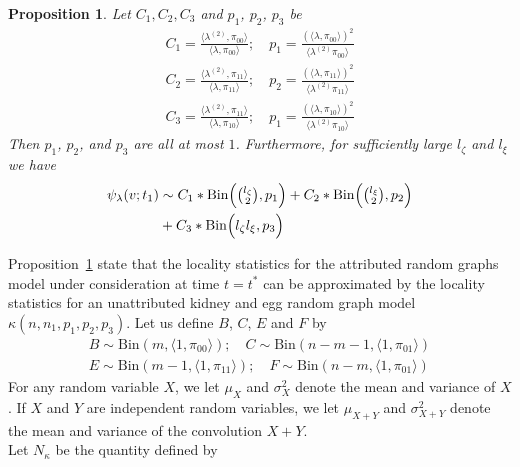 \documentclass[draftcls]{IEEEtran}
\newtheorem{proposition}[theorem]{Proposition}
\theoremstyle{definition}
\begin{document}
\begin{proposition}
  \label{prop:2}
  Let $C_1, C_2, C_3$ and $p_1$, $p_2$, $p_3$ be 
  \begin{gather*}
C_1 = \tfrac{\langle \lambda^{(2)}, \pi_{00} \rangle}{\langle \lambda,
    \pi_{00}\rangle}; \quad p_1 = \tfrac{(\langle \lambda, \pi_{00}
    \rangle)^{2}}{\langle \lambda^{(2)} \pi_{00} \rangle} \\
C_2 = \tfrac{\langle \lambda^{(2)}, \pi_{11} \rangle}{\langle \lambda,
    \pi_{11}\rangle}; \quad p_2 = \tfrac{(\langle \lambda, \pi_{11}
    \rangle)^{2}}{\langle \lambda^{(2)} \pi_{11} \rangle} \\
C_3 = \tfrac{\langle \lambda^{(2)}, \pi_{11} \rangle}{\langle \lambda,
    \pi_{10}\rangle}; \quad p_1 = \tfrac{(\langle \lambda, \pi_{10}
    \rangle)^{2}}{\langle \lambda^{(2)} \pi_{10} \rangle} 
\end{gather*}
  Then $p_1$, $p_2$, and $p_3$ are all at most $1$. Furthermore, for
  sufficiently large $l_\zeta$ and $l_\xi$ we have
\begin{equation*}
  \begin{split}
 \psi_{\lambda}(v;t_1) &\sim C_1 *  
 \mathrm{Bin}\Bigl(\tbinom{l_\zeta}{2}, p_1\Bigr) + C_2 *  
 \mathrm{Bin}\Bigl(\tbinom{l_\xi}{2}, p_2\Bigr) \\ &+ C_3 *
 \mathrm{Bin}\Bigl(l_\zeta l_\xi, p_3\Bigr)
 \end{split}
\end{equation*} 
\end{proposition}
Proposition~\ref{prop:2} state that the locality statistics
for the attributed random graphs model under consideration at time $t
= t^{*}$ can be approximated by the locality
statistics for an unattributed kidney and egg random graph model
$\kappa(n,n_1,p_1,p_2,p_3)$. Let us define $B$, $C$, $E$ and $F$ by
\begin{gather*}
  B \sim \mathrm{Bin}(m, \langle 1, \pi_{00} \rangle); \quad C \sim \mathrm{Bin}(n-m-1,
 \langle 1, \pi_{01} \rangle) \\
  E \sim \mathrm{Bin}(m-1, \langle 1, \pi_{11} \rangle); \quad F \sim \mathrm{Bin}(n-m,
  \langle 1, \pi_{01} \rangle)
\end{gather*}
For any random variable $X$, we let $\mu_X$ and $\sigma_X^{2}$ denote
the mean and variance of $X$. If $X$ and $Y$ are independent random
variables, we let $\mu_{X + Y}$ and $\sigma_{X + Y}^2$ denote the mean
and variance of the convolution $X + Y$. \\
\noindent Let $N_{\kappa}$ be the quantity defined by
\end{document}
